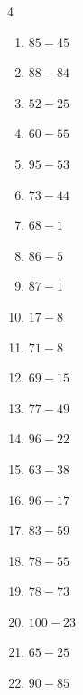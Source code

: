\begin{multicols}{4}
\begin{enumerate}
  \item $85-45$
        \phantom{$=40$}

  \item $88-84$
        \phantom{$=4$}

  \item $52-25$
        \phantom{$=27$}

  \item $60-55$
        \phantom{$=5$}

  \item $95-53$
        \phantom{$=42$}

  \item $73-44$
        \phantom{$=29$}

  \item $68-1$
        \phantom{$=67$}

  \item $86-5$
        \phantom{$=81$}

  \item $87-1$
        \phantom{$=86$}

  \item $17-8$
        \phantom{$=9$}

  \item $71-8$
        \phantom{$=63$}

  \item $69-15$
        \phantom{$=54$}

  \item $77-49$
        \phantom{$=28$}

  \item $96-22$
        \phantom{$=74$}

  \item $63-38$
        \phantom{$=25$}

  \item $96-17$
        \phantom{$=79$}

\columnbreak %

  \item $83-59$
        \phantom{$=24$}

  \item $78-55$
        \phantom{$=23$}

  \item $78-73$
        \phantom{$=5$}

  \item $100-23$
        \phantom{$=77$}

  \item $65-25$
        \phantom{$=40$}

  \item $90-85$
        \phantom{$=5$}


\end{enumerate}
\end{multicols}
